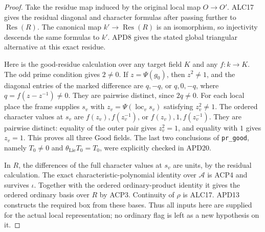 \documentclass[11pt,a4paper]{article}
\numberwithin{equation}{section}
\theoremstyle{remark}\newtheorem{remark}[theorem]{Remark}
\begin{document}
\begin{proof}
Take the residue map induced by the original local map \(O\to O'\).
ALC17 gives the residual diagonal and character formulas after
passing further to \(\operatorname{Res}(R)\).  The canonical
map \(k'\to\operatorname{Res}(R)\) is an isomorphism, so
injectivity descends the same formulas to \(k'\).  APD8 gives
the stated global triangular alternative at this exact residue.

Here is the good-residue calculation over any target field \(K\)
and any \(f:k\to K\).  The odd prime condition gives
\(2\ne0\).  If \(z=\Psi(g_0)\), then \(z^2\ne1\),
and the diagonal entries of the marked difference are
\(q,-q\), or \(q,0,-q\), where \(q=f(z-z^{-1})\ne0\).
They are pairwise distinct, since \(2q\ne0\).
For each local place the frame supplies \(s_v\) with
\(z_v=\Psi(\operatorname{loc}_v s_v)\) satisfying
\(z_v^2\ne1\).  The ordered character values at \(s_v\)
are \(f(z_v),f(z_v^{-1})\), or
\(f(z_v),1,f(z_v^{-1})\).  They are pairwise distinct:
equality of the outer pair gives \(z_v^2=1\), and equality
with \(1\) gives \(z_v=1\).  This proves all three
\(\mathrm{Good}\) fields.  The last two conclusions of
\texttt{pr\_\allowbreak good}, namely \(T_0\ne0\) and
\(\theta_{\mathrm{Lie}}T_0=T_0\), were explicitly checked
in APD20.

In \(R\), the differences of the full character values at
\(s_v\) are units, by the residual calculation.  The exact
characteristic-polynomial identity over \(\mathcal A\) is
ACP4 and survives \(\iota\).  Together with the ordered
ordinary-product identity it gives the ordered ordinary basis
over \(R\) by ACP3.  Continuity of \(\rho\) is ALC17.
APD13 constructs the required box from these bases.  Thus all
inputs here are supplied for the actual local representation;
no ordinary flag is left as a new hypothesis on it.
\end{proof}

\end{document}

